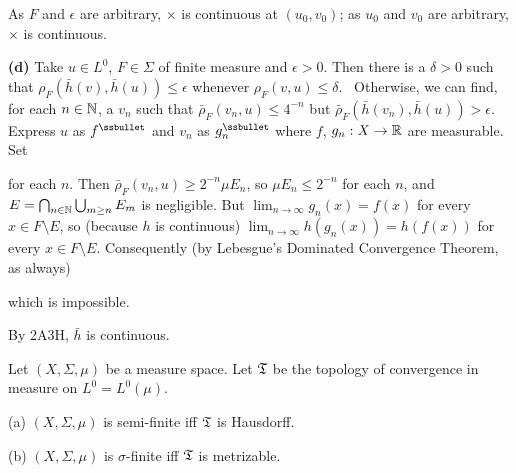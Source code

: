 {\noindent As $F$ and $\epsilon$ are arbitrary, $\times$ is continuous at
$(u_0,v_0)$;  as $u_0$ and $v_0$ are arbitrary, $\times$ is continuous.

\medskip

{\bf (d)} Take $u\in L^0$, $F\in\Sigma$ of finite measure and
$\epsilon>0$.   Then there is a $\delta>0$ such that
$\rho_F(\bar h(v),\bar h(u))\le\epsilon$ whenever $\rho_F(v,u)\le\delta$.
\Prf\Quer\ Otherwise, we can find, for each $n\in\Bbb N$, a $v_n$ such
that $\bar\rho_F(v_n,u)\le 4^{-n}$ but
$\bar\rho_F(\bar h(v_n),\bar h(u))>\epsilon$.
Express $u$ as $f^{\ssbullet}$ and $v_n$ as
$g_n^{\ssbullet}$ where $f$, $g_n:X\to\Bbb R$ are measurable.   Set


\noindent for each $n$.   Then $\bar\rho_F(v_n,u)\ge 2^{-n}\mu E_n$, so
$\mu E_n\le 2^{-n}$ for each $n$, and $E=\bigcap_{n\in\Bbb
N}\bigcup_{m\ge n}E_m$ is negligible.   But
$\lim_{n\to\infty}g_n(x)=f(x)$ for every $x\in F\setminus E$, so
(because $h$ is continuous) $\lim_{n\to\infty}h(g_n(x))=h(f(x))$ for
every $x\in F\setminus E$.   Consequently (by Lebesgue's Dominated
Convergence Theorem, as always)


\noindent which is impossible.\ \Bang\Qed

By 2A3H, $\bar h$ is continuous.
}%




 Let $(X,\Sigma,\mu)$ be a measure space.   Let
$\frak T$ be the topology of convergence in measure  on
$L^0=L^0(\mu)$.

(a) $(X,\Sigma,\mu)$ is semi-finite iff $\frak T$ is Hausdorff.

(b) $(X,\Sigma,\mu)$ is $\sigma$-finite iff $\frak T$ is metrizable.

